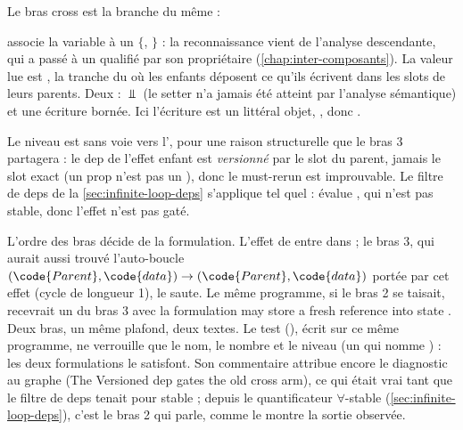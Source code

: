 Le bras cross est la branche  du même  :


 associe la variable  à un  $\{$, $\}$ : la reconnaissance vient de l'analyse descendante, qui a passé à  un  qualifié par son propriétaire (\cref{chap:inter-composants}). La valeur lue est , la tranche du  où les enfants déposent ce qu'ils écrivent dans les slots de leurs parents. Deux  : $\Bot$ (le setter n'a jamais été atteint par l'analyse sémantique) et une écriture bornée. Ici l'écriture est un littéral objet, , donc .

Le niveau est \Warning{} sans voie vers l'\Error, pour une raison structurelle que le bras 3 partagera : le dep  de l'effet enfant est \emph{versionné} par le slot du parent, jamais le slot exact (un prop n'est pas un ), donc le must-rerun est improuvable. Le filtre de deps de la \cref{sec:infinite-loop-deps} s'applique tel quel :  évalue , qui n'est pas stable, donc l'effet n'est pas gaté.

\begin{piege}
L'ordre des bras décide de la formulation. L'effet de  entre dans  ; le bras 3, qui aurait aussi trouvé l'auto-boucle $(\code{Parent}, \code{data}) \to (\code{Parent}, \code{data})$ portée par cet effet (cycle  de longueur 1), le saute. Le même programme, si le bras 2 se taisait, recevrait un \Warning{} du bras 3 avec la formulation \og may store a fresh reference into state \fg. Deux bras, un même plafond, deux textes. Le test  (), écrit sur ce même programme, ne verrouille que le nom, le nombre et le niveau (un \Warning{} qui nomme ) : les deux formulations le satisfont. Son commentaire attribue encore le diagnostic au graphe (\og The Versioned dep gates the old cross arm\fg), ce qui était vrai tant que le filtre de deps tenait  pour stable ; depuis le quantificateur $\forall$-stable (\cref{sec:infinite-loop-deps}), c'est le bras 2 qui parle, comme le montre la sortie observée.
\end{piege}

